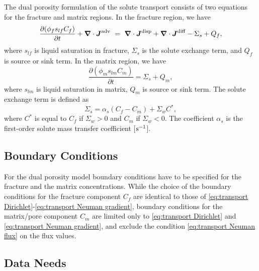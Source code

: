 The dual porosity formulation of the solute transport consists of two equations
for the fracture and matrix regions. 
In the fracture region, we have \citep{simunek-vangenuchten_2008}
\begin{equation}  \label{eq:MassConservation}
  \frac{\partial (\phi_f s_{lf} C_f)}{\partial t} 
  + 
  {\boldsymbol{\nabla}} \cdot {\boldsymbol{J}}^\text{adv} \ =\  {\boldsymbol{\nabla}} \cdot {\boldsymbol{J}}^\text{disp} 
  + 
  {\boldsymbol{\nabla}} \cdot {\boldsymbol{J}}^\text{diff} - \Sigma_s + Q_f,
\end{equation}
where $s_{lf}$ is liquid saturation in fracture, 
$\Sigma_s$ is the solute exchange term,
and $Q_f$ is source or sink term.
In the matrix region, we have
$$
  \frac{\partial (\phi_m s_{lm} C_m)}{\partial t}
  = \Sigma_s + Q_m,
$$
where $s_{lm}$ is liquid saturation in matrix, $Q_m$ is source or sink term.
The solute exchange term is defined as
$$
  \Sigma_s = \alpha_s (C_f - C_m) + \Sigma_w C^*,
$$
where $C^*$ is equal to $C_f$ if $\Sigma_w > 0$ and $C_m$ if $\Sigma_w < 0$.
The coefficient $\alpha_s$ is the first-order solute mass transfer coefficient [${\rm s}^{-1}$].



\subsection{Boundary Conditions} 
\label{sec:transport-boundary-conditions-dual-porosity}

\noindent 
For the dual porosity model boundary conditions have to be specified 
for the fracture and the matrix concentrations.
While the choice of the boundary conditions for the fracture component $C_f$ 
are identical to those of \eqref{eq:transport Dirichlet}-\eqref{eq:transport Neuman gradient},
boundary conditions for the matrix/pore component $C_m$
are limited only to  \eqref{eq:transport Dirichlet} and 
\eqref{eq:transport Neuman gradient}, and exclude the condition \eqref{eq:transport Neuman flux}
on the flux values.






\subsection{Data Needs}

